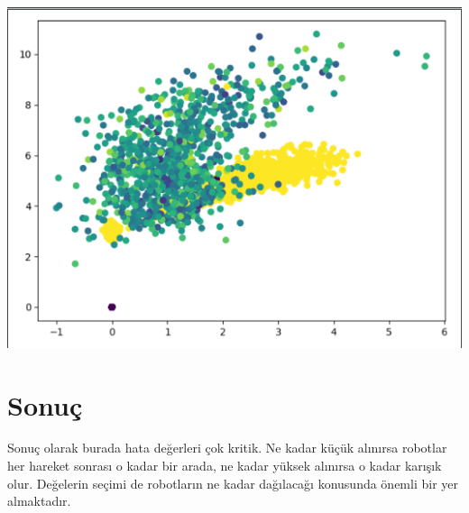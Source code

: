 \documentclass{article}
\begin{document}
\begin{center}
		\includegraphics[scale=0.4]{step6.1}
	\end{center}
\section{Sonuç}
Sonuç olarak burada hata değerleri çok kritik. Ne kadar küçük alınırsa robotlar her hareket sonrası o kadar bir arada, ne kadar yüksek alınırsa o kadar karışık olur. Değelerin seçimi de robotların ne kadar dağılacağı konusunda önemli bir yer almaktadır.
\end{document}
